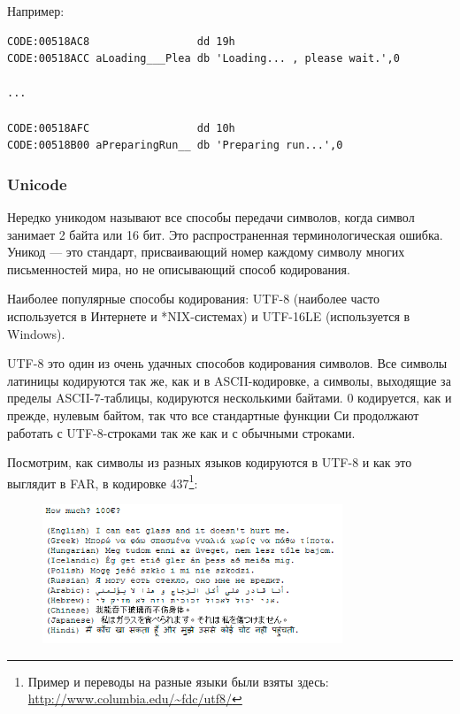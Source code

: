 Например:

\begin{lstlisting}[caption=Delphi,style=customasmx86]
CODE:00518AC8                 dd 19h
CODE:00518ACC aLoading___Plea db 'Loading... , please wait.',0

...

CODE:00518AFC                 dd 10h
CODE:00518B00 aPreparingRun__ db 'Preparing run...',0
\end{lstlisting}

\subsubsection{Unicode}

Нередко уникодом называют все способы передачи символов, когда символ занимает 2 байта или 16 бит.
Это распространенная терминологическая ошибка.
Уникод --- это стандарт, присваивающий номер каждому символу многих письменностей мира, но не описывающий
способ кодирования.

Наиболее популярные способы кодирования: 
UTF-8 (наиболее часто используется в Интернете и *NIX-системах) и UTF-16LE (используется в Windows).


UTF-8 это один из очень удачных способов кодирования символов.
Все символы латиницы кодируются так же, как и в ASCII-кодировке, а символы, выходящие за пределы
ASCII-7-таблицы, кодируются несколькими байтами.
0 кодируется, как и прежде, нулевым байтом, так что все стандартные
функции Си продолжают работать с UTF-8-строками так же как и с обычными строками.

Посмотрим, как символы из разных языков кодируются в UTF-8 и как это выглядит в FAR, в кодировке 437\footnote{Пример и переводы на разные языки были взяты здесь: 
\url{http://www.columbia.edu/~fdc/utf8/}}:

\begin{figure}[H]
\centering
\includegraphics[width=0.8\textwidth]{digging_into_code/strings/multilang_sampler.png}
\end{figure}

